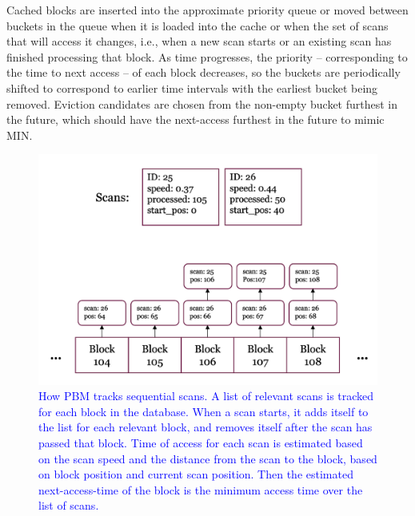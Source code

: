 Cached blocks are inserted into the approximate priority queue or moved between buckets in the queue when it is loaded into the cache or when the set of scans that will access it changes, i.e., when a new scan starts or an existing scan has finished processing that block. As time progresses, the priority -- corresponding to the time to next access -- of each block decreases, so the buckets are periodically shifted to correspond to earlier time intervals with the earliest bucket being removed. Eviction candidates are chosen from the non-empty bucket furthest in the future, which should have the next-access furthest in the future to mimic MIN.

\begin{figure}
    \centering
    \includegraphics[width=1\columnwidth]{figures/Diagrams/seq_scan_registered_progress.png}
    \caption[PBM sequential scan tracking]{\textcolor{blue}{How PBM tracks sequential scans. A list of relevant scans is tracked for each block in the database. When a scan starts, it adds itself to the list for each relevant block, and removes itself after the scan has passed that block. Time of access for each scan is estimated based on the scan speed and the distance from the scan to the block, based on block position and current scan position. Then the estimated next-access-time of the block is the minimum access time over the list of scans.}}
    \label{fig:scan_tracking}
\end{figure}


